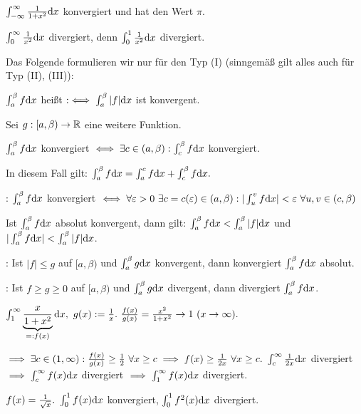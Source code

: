 \documentclass[a4paper,twoside,DIV15,BCOR12mm]{scrbook}
\begin{document}
\begin{beispiele}
\item $\int_{-\infty}^\infty\frac{1}{1+x^2}\text{d}x$ konvergiert und hat den Wert $\pi$.

\item $\int_0^\infty \frac{1}{x^2}\text{d}x$ divergiert, denn $\int_0^1 \frac{1}{x^2}\text{d}x$ divergiert.
\end{beispiele}

Das Folgende formulieren wir nur für den Typ (I) (sinngemäß gilt alles auch für Typ (II), (III)):

\begin{definition}
$\int_a^\beta f\text{d}x$ heißt  $:\iff \int_a^\beta |f|\text{d}x$ ist konvergent.
\end{definition}

\begin{satz*}
Sei $g:[a,\beta) \to \mathbb{R}$ eine weitere Funktion.
\begin{liste}
\item $\int_a^\beta f\text{d}x$ konvergiert $\iff \exists c \in (a,\beta): \int_c^\beta f\text{d}x$ konvergiert.

In diesem Fall gilt: $\int_a^\beta f\text{d}x = \int_a^c f\text{d}x + \int_c^\beta f\text{d}x.$

\item {}: $\int_a^\beta f\text{d}x$ konvergiert $\iff \forall \varepsilon>0\ \exists c=c(\varepsilon) \in (a,\beta): |\int_u^v f\text{d}x| < \varepsilon\ \forall u,v \in (c,\beta)$

\item Ist $\int_a^\beta f\text{d}x$ absolut konvergent, dann gilt: $\int_a^\beta f\text{d}x < \int_a^\beta |f|\text{d}x$ und $|\int_a^\beta f\text{d}x| < \int_a^\beta |f|\text{d}x$.

\item {}: Ist $|f| \le g$ auf $[a,\beta)$ und $\int_a^\beta g\text{d}x$ konvergent, dann konvergiert $\int_a^\beta f\text{d}x$ absolut.

\item {}: Ist $f \ge g \ge 0$ auf $[a,\beta)$ und $\int_a^\beta g\text{d}x$ divergent, dann divergiert $\int_a^\beta f\text{d}x$.
\end{liste}
\end{satz*}

\begin{beispiele}
\item $\int_1^\infty \underbrace{\frac{x}{1+x^2}}_{=:f(x)}\dx,\ g(x) := \frac{1}{x}.\ \frac{f(x)}{g(x)} = \frac{x^2}{1+x^2} \to 1\ (x\to\infty).$

$\implies \exists c \in (1,\infty): \frac{f(x)}{g(x)} \ge \frac{1}{2}\ \forall x \ge c \implies f(x) \ge \frac{1}{2x}\ \forall x \ge c.\ \int_c^\infty \frac{1}{2x}\text{d}x$ divergiert $\implies \int_c^\infty f(x)\text{d}x$ divergiert $\implies \int_1^\infty f(x)\text{d}x$ divergiert.

\item $f(x) = \frac{1}{\sqrt{x}}.\ \int_0^1 f(x)\text{d}x$ konvergiert, $\int_0^1 f^2(x)\text{d}x$ divergiert.
\end{beispiele}
\end{document}
